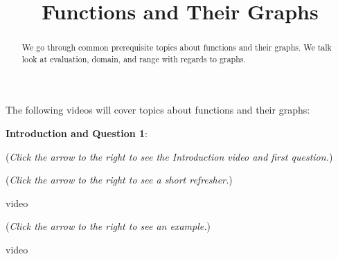 \documentclass{ximera}
\title[Prerequisite Videos: ]{Functions and Their Graphs}
\begin{document}
\begin{abstract}
  We go through common prerequisite topics about functions and their graphs. 
  We talk look at evaluation, domain, and range with regards to graphs.
\end{abstract}
\maketitle

The following videos will cover topics about functions and their graphs:

\textbf{Introduction and Question 1}:
\begin{flushright}
{\color{blue}(\emph{Click the arrow to the right to see the Introduction video and first question.})}
\end{flushright}

\begin{center}
\begin{expandable}

\begin{expandable}
\begin{multipleChoice}
\end{multipleChoice}

\begin{flushright}
{\color{blue}(\emph{Click the arrow to the right to see a short refresher.})}
\end{flushright}
\begin{expandable}
video
\end{expandable}

\begin{flushright}
{\color{blue}(\emph{Click the arrow to the right to see an example.})}
\end{flushright}
\begin{expandable}
video
\end{expandable}

\end{expandable}
\end{expandable}
\end{center}
\end{document}

